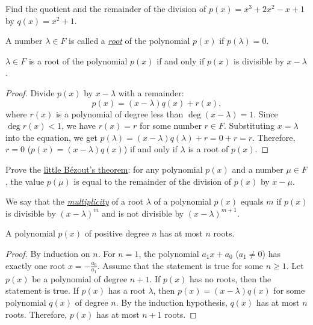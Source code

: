 \begin{exercise}
Find the quotient and the remainder of the division of $p(x) = x^3 + 2x^2 - x + 1$ by $q(x) = x^2 + 1$.
\end{exercise}

\begin{definition}
A number $\lambda\in F$ is called a \underline{\it root} of the polynomial $p(x)$ if $p(\lambda) = 0$.
\end{definition}

\begin{lemma}
$\lambda\in F$ is a root of the polynomial $p(x)$ if and only if $p(x)$ is divisible by $x - \lambda$.
\end{lemma}

\begin{proof}
Divide $p(x)$ by $x - \lambda$ with a remainder:
$$p(x) = (x - \lambda)q(x) + r(x),$$
where $r(x)$ is a polynomial of degree less than $\deg(x - \lambda) = 1$. Since $\deg r(x) < 1$, we have $r(x) = r$ for some number $r\in F$. Substituting $x = \lambda$ into the equation, we get $p(\lambda) = (x - \lambda)q(\lambda) + r = 0 + r = r$. Therefore, $r = 0$ ($p(x) = (x-\lambda)q(x)$) if and only if $\lambda$ is a root of $p(x)$.
\end{proof}

\begin{exercise}
Prove the \underline{little Bézout's theorem}: for any polynomial $p(x)$ and a number $\mu\in F$, the value $p(\mu)$ is equal to the remainder of the division of $p(x)$ by $x - \mu$.
\end{exercise}

\begin{definition}
We say that the \underline{\it multiplicity} of a root $\lambda$ of a polynomial $p(x)$ equals $m$ if $p(x)$ is divisible by $(x - \lambda)^m$ and is not divisible by $(x - \lambda)^{m+1}$.
\end{definition}

\begin{lemma}
A polynomial $p(x)$ of positive degree $n$ has at most $n$ roots.
\end{lemma}
\begin{proof}
By induction on $n$. For $n = 1$, the polynomial $a_1 x + a_0$ ($a_1 \neq 0$) has exactly one root $x = -\frac{a_0}{a_1}$. Assume that the statement is true for some $n \geqslant 1$. Let $p(x)$ be a polynomial of degree $n+1$. If $p(x)$ has no roots, then the statement is true. If $p(x)$ has a root $\lambda$, then $p(x) = (x - \lambda)q(x)$ for some polynomial $q(x)$ of degree $n$. By the induction hypothesis, $q(x)$ has at most $n$ roots. Therefore, $p(x)$ has at most $n+1$ roots.
\end{proof}

